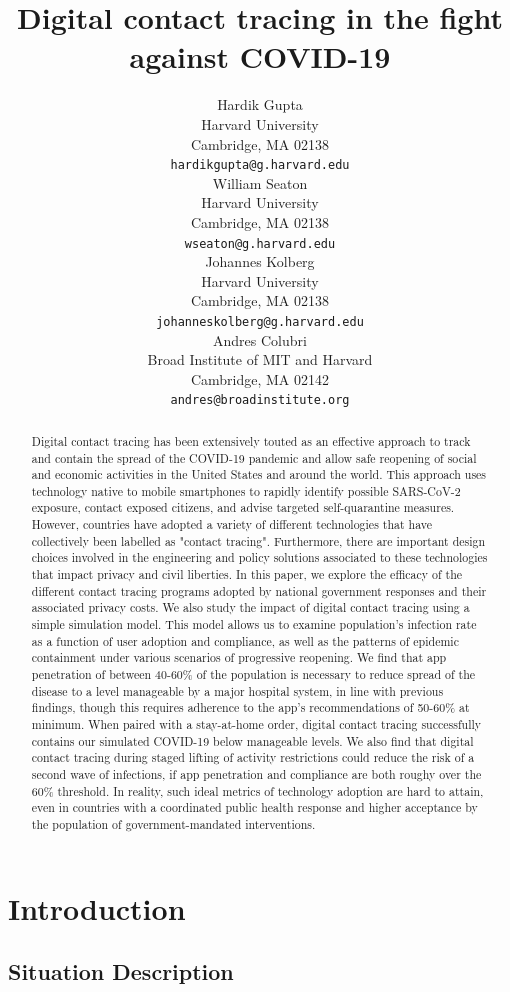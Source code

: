 \documentclass{article}
\title{Digital contact tracing in the fight against COVID-19}
\author{
 Hardik Gupta \\
  Harvard University\\
  Cambridge, MA 02138 \\
  \texttt{hardikgupta@g.harvard.edu} \\
   \And
 William Seaton \\
  Harvard University\\
  Cambridge, MA 02138 \\
  \texttt{wseaton@g.harvard.edu} \\
   \And
 Johannes Kolberg \\
  Harvard University\\
  Cambridge, MA 02138 \\
  \texttt{johanneskolberg@g.harvard.edu} \\  
  \And
 Andres Colubri \\
  Broad Institute of MIT and Harvard\\
  Cambridge, MA 02142 \\
  \texttt{andres@broadinstitute.org} \\
}
\begin{document}
\maketitle
\begin{abstract}
Digital contact tracing has been extensively touted as an effective approach to track and contain the spread of the COVID-19 pandemic and allow safe reopening of social and economic activities in the United States and around the world. This approach uses technology native to mobile smartphones to rapidly identify possible SARS-CoV-2 exposure, contact exposed citizens, and advise targeted self-quarantine measures. However, countries have adopted a variety of different technologies that have collectively been labelled as "contact tracing". Furthermore, there are important design choices involved in the engineering and policy solutions associated to these technologies that impact privacy and civil liberties. In this paper, we explore the efficacy of the different contact tracing programs adopted by national government responses and their associated privacy costs. We also study the impact of digital contact tracing using a simple simulation model. This model allows us to examine population's infection rate as a function of user adoption and compliance, as well as the patterns of epidemic containment under various scenarios of progressive reopening. We find that app penetration of between 40-60\% of the population is necessary to reduce spread of the disease to a level manageable by a major hospital system, in line with previous findings, though this requires adherence to the app’s recommendations of 50-60\% at minimum. When paired with a stay-at-home order, digital contact tracing successfully contains our simulated COVID-19 below manageable levels. We also find that digital contact tracing during staged lifting of activity restrictions could reduce the risk of a second wave of infections, if app penetration and compliance are both roughy over the 60\% threshold. In reality, such ideal metrics of technology adoption are hard to attain, even in countries with a coordinated public health response and higher acceptance by the population of government-mandated interventions.
\end{abstract}

\section{Introduction}

\subsection{Situation Description}
\end{document}
